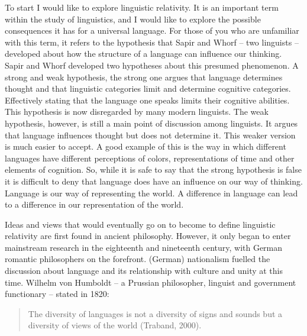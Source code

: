 To start I would like to explore linguistic relativity. It is an important term within the study of linguistics, and I would like to explore the possible consequences it has for a universal language. For those of you who are unfamiliar with this term, it refers to the hypothesis that Sapir and Whorf – two linguists – developed about how the structure of a language can influence our thinking. Sapir and Whorf developed two hypotheses about this presumed phenomenon. A strong and weak hypothesis, the strong one argues that language determines thought and that linguistic categories limit and determine cognitive categories. Effectively stating that the language one speaks limits their cognitive abilities. This hypothesis is now disregarded by many modern linguists. The weak hypothesis, however, is still a main point of discussion among linguists. It argues that language influences thought but does not determine it. This weaker version is much easier to accept. A good example of this is the way in which different languages have different perceptions of colors, representations of time and other elements of cognition. So, while it is safe to say that the strong hypothesis is false it is difficult to deny that language does have an influence on our way of thinking. Language is our way of representing the world. A difference in language can lead to a difference in our representation of the world. 

 
	Ideas and views that would eventually go on to become to define linguistic relativity are first found in ancient philosophy. However, it only began to enter mainstream research in the eighteenth and nineteenth century, with German romantic philosophers on the forefront. (German) nationalism fuelled the discussion about language and its relationship with culture and unity at this time. Wilhelm von Humboldt – a Prussian philosopher, linguist and government functionary – stated in 1820:  

\begin{quote}
\begin{singlespace}
The diversity of languages is not a diversity of signs and sounds but a diversity of views of the world (Traband, 2000). 
\end{singlespace}
\end{quote}

